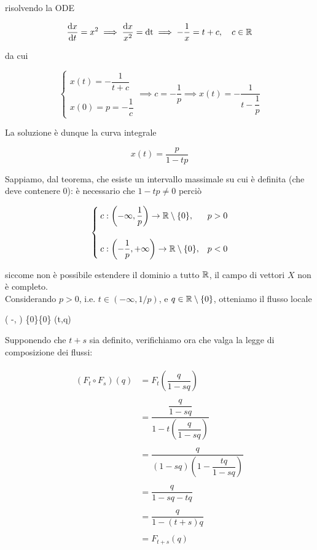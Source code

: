 risolvendo la ODE

\begin{equation}
	\dv{x}{t} = x^{2} %
	\implies %
	\dfrac{\dd{x}}{x^{2}} = \operatorname{dt} %
	\implies %
	- \dfrac{1}{x} = t + c \qcomma c \in \R
\end{equation}

da cui

\begin{equation}
	\begin{cases}
		x(t) = - \dfrac{1}{t + c} \\ \\
		x(0) = p = - \dfrac{1}{c}
	\end{cases} %
	\implies %
	c = - \dfrac{1}{p} %
	\implies %
	x(t) = - \dfrac{1}{t - \dfrac{1}{p}}
\end{equation}

La soluzione è dunque la curva integrale

\begin{equation}
	x(t) = \dfrac{p}{1 - t p}
\end{equation}

Sappiamo, dal teorema, che esiste un intervallo massimale su cui è definita (che deve contenere 0): è necessario che $ 1-tp \neq 0 $ perciò

\begin{equation}
	\begin{cases}
		c : \left( -\infty, \dfrac{1}{p} \right) \to \mathbb{R} \setminus \{0\}, & p > 0 \\ \\
		c : \left( -\dfrac{1}{p}, +\infty \right) \to \mathbb{R} \setminus \{0\}, & p < 0
	\end{cases}
\end{equation}

siccome non è possibile estendere il dominio a tutto $ \mathbb{R} $, il campo di vettori $ X $ non è completo. \\
Considerando $ p>0 $, i.e. $ t \in (-\infty, 1/p) $, e $ q \in \mathbb{R} \setminus \{0\} $, otteniamo il flusso locale

	{\left( -\infty,  \right) \times \R \setminus \{0\}}{\R \setminus \{0\}}
	{(t,q)}{}

Supponendo che $ t+s $ sia definito, verifichiamo ora che valga la legge di composizione dei flussi:

\begin{align}
	\begin{split}
		(F_{t} \circ F_{s})(q) &= F_{t} \left( \dfrac{q}{1 - s q} \right) \\ \\
		&= \dfrac{\dfrac{q}{1 - s q}}{1 - t \left( \dfrac{q}{1 - s q} \right)} \\ \\
		&= \dfrac{q}{(1 - s q) \left(1 - \dfrac{t q}{1 - s q} \right)} \\ \\
		&= \dfrac{q}{1 - s q - t q} \\ \\
		&= \dfrac{q}{1 - (t+s) q} \\ \\
		&= F_{t+s}(q)
	\end{split}
\end{align}

